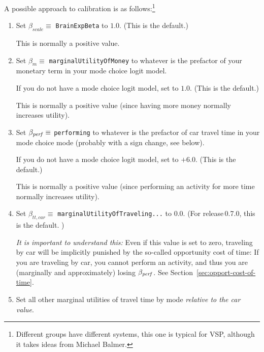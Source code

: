 
A possible approach to calibration is as follows:\footnote{%
%
Different groups have different systems, this one is typical for VSP, although it takes ideas from Michael Balmer.
%
}
\begin{enumerate}

\item Set $\beta_{scale} \equiv$ \verb$BrainExpBeta$ to $1.0$.  (This is the default.)

This is normally a positive value.

\item Set $\beta_{m} \equiv$ \verb$marginalUtilityOfMoney$ to whatever is the prefactor of your monetary term in your mode choice logit model.

If you do not have a mode choice logit model, set to $1.0$.  (This is the default.)

This is normally a positive value (since having more money normally increases utility).

\item Set $\beta_{\it perf} \equiv$ \verb$performing$ to whatever is the prefactor of car travel time in your mode choice mode (probably with a sign change, see below).

If you do not have a mode choice logit model, set to $+6.0$.  (This is the default.)

This is normally a positive value (since performing an activity for more time normally increases utility).

\item Set $\beta_{tt,car} \equiv$ \verb$marginalUtilityOfTraveling...$ to $0.0$. (For release\,0.7.0, this is the default. )

\emph{It is important to understand this:}  Even if this value is set to zero, traveling by car will be implicitly punished by the so-called opportunity cost of time: If you are traveling by car, you cannot perform an activity, and thus you are (marginally and approximately) losing $\beta_{\it perf}$.  See Section~\ref{sec:opport-cost-of-time}.

\item Set all other marginal utilities of travel time by mode \emph{relative to the car value}.


\end{enumerate}
